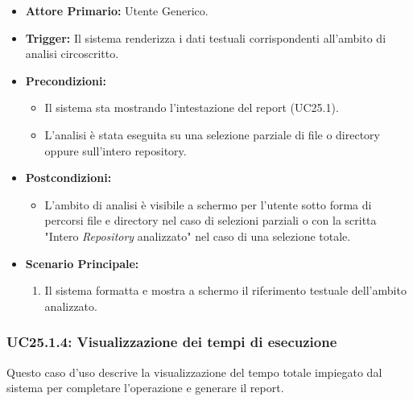 \documentclass[12pt, a4paper]{article}
\begin{document}
\begin{itemize}
    \item \textbf{Attore Primario:} Utente Generico.
    \item \textbf{Trigger:} Il sistema renderizza i dati testuali corrispondenti all'ambito di analisi circoscritto.
    \item \textbf{Precondizioni:}
    \begin{itemize}
        \item Il sistema sta mostrando l'intestazione del report (UC25.1).
        \item L'analisi è stata eseguita su una selezione parziale di file o directory oppure sull'intero repository.
    \end{itemize}\newpage
    \item \textbf{Postcondizioni:}
    \begin{itemize}
        \item L'ambito di analisi è visibile a schermo per l'utente sotto forma di percorsi file e directory nel caso di selezioni parziali o con la scritta "Intero \textit{Repository} analizzato" nel caso di una selezione totale.
    \end{itemize}
    \item \textbf{Scenario Principale:}
    \begin{enumerate}
        \item Il sistema formatta e mostra a schermo il riferimento testuale dell'ambito analizzato.
    \end{enumerate}
\end{itemize}

\subsubsection{UC25.1.4: Visualizzazione dei tempi di esecuzione}\label{uc:25.1.4}
Questo caso d'uso descrive la visualizzazione del tempo totale impiegato dal sistema per completare l'operazione e generare il report.
\end{document}
